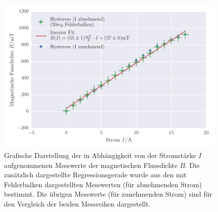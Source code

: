 \FloatBarrier
\begin{figure}[!h]
\centering
\includegraphics[scale=1]{../Grafiken/Hysterese_Messung_I_abnehmend.pdf}
\caption{Grafische Darstellung der in Abhängigkeit von der Stromstärke $I$
         aufgenommenen Messwerte der magnetischen Flussdichte $B$.
         Die zusätzlich dargestellte Regressionsgerade wurde aus den mit
         Fehlerbalken dargestellten Messwerten (für abnehmenden Strom) bestimmt.
         Die übrigen Messwerte (für zunehmenden Strom) sind für den Vergleich
         der beiden Messreihen dargestellt.\label{fig:hysterese_messung_i_abnehmend}}
\end{figure}
\FloatBarrier
